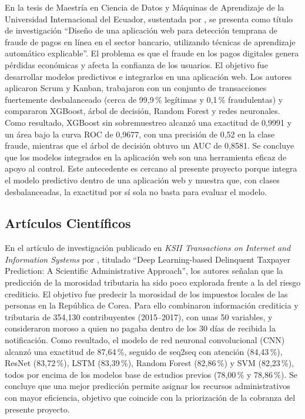\documentclass[12pt,a4paper]{report}
\begin{document}
En la tesis de Maestría en Ciencia de Datos y Máquinas de Aprendizaje de la Universidad Internacional del Ecuador, sustentada por \textcite{encalada2025}, se presenta como título de investigación ``Diseño de una aplicación web para detección temprana de fraude de pagos en línea en el sector bancario, utilizando técnicas de aprendizaje automático explicable''. El problema es que el fraude en los pagos digitales genera pérdidas económicas y afecta la confianza de los usuarios. El objetivo fue desarrollar modelos predictivos e integrarlos en una aplicación web. Los autores aplicaron Scrum y Kanban, trabajaron con un conjunto de transacciones fuertemente desbalanceado (cerca de 99,9\,\% legítimas y 0,1\,\% fraudulentas) y compararon XGBoost, árbol de decisión, Random Forest y redes neuronales. Como resultado, XGBoost sin sobremuestreo alcanzó una exactitud de 0,9991 y un área bajo la curva ROC de 0,9677, con una precisión de 0,52 en la clase fraude, mientras que el árbol de decisión obtuvo un AUC de 0,8581. Se concluye que los modelos integrados en la aplicación web son una herramienta eficaz de apoyo al control. Este antecedente es cercano al presente proyecto porque integra el modelo predictivo dentro de una aplicación web y muestra que, con clases desbalanceadas, la exactitud por sí sola no basta para evaluar el modelo.

\subsection{Artículos Científicos}

En el artículo de investigación publicado en \textit{KSII Transactions on Internet and Information Systems} por \textcite{leekim2024}, titulado ``Deep Learning-based Delinquent Taxpayer Prediction: A Scientific Administrative Approach'', los autores señalan que la predicción de la morosidad tributaria ha sido poco explorada frente a la del riesgo crediticio. El objetivo fue predecir la morosidad de los impuestos locales de las personas en la República de Corea. Para ello combinaron información crediticia y tributaria de 354,130 contribuyentes (2015--2017), con unas 50 variables, y consideraron moroso a quien no pagaba dentro de los 30 días de recibida la notificación. Como resultado, el modelo de red neuronal convolucional (CNN) alcanzó una exactitud de 87,64\,\%, seguido de seq2seq con atención (84,43\,\%), ResNet (83,72\,\%), LSTM (83,39\,\%), Random Forest (82,86\,\%) y SVM (82,23\,\%), todos por encima de los modelos base de estudios previos (78,00\,\% y 78,86\,\%). Se concluye que una mejor predicción permite asignar los recursos administrativos con mayor eficiencia, objetivo que coincide con la priorización de la cobranza del presente proyecto.
\end{document}
